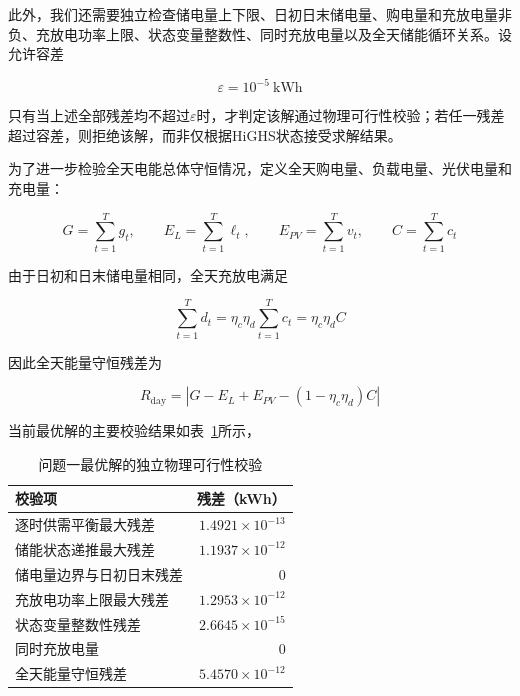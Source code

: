 \documentclass[UTF8]{ctexart}
\begin{document}
    此外，我们还需要独立检查储电量上下限、日初日末储电量、购电量和充放电量非负、充放电功率上限、状态变量整数性、同时充放电量以及全天储能循环关系。设允许容差
    
    \begin{equation}
        \varepsilon=10^{-5}\ \mathrm{kWh}
    \end{equation}
    
    只有当上述全部残差均不超过$\varepsilon$时，才判定该解通过物理可行性校验；若任一残差超过容差，则拒绝该解，而非仅根据HiGHS状态接受求解结果。\par
    
    为了进一步检验全天电能总体守恒情况，定义全天购电量、负载电量、光伏电量和充电量：
    
    \begin{equation}
        G=\sum_{t=1}^{T}g_t,\qquad
        E_L=\sum_{t=1}^{T}\ell_t,\qquad
        E_{PV}=\sum_{t=1}^{T}v_t,\qquad
        C=\sum_{t=1}^{T}c_t
    \end{equation}
    
    由于日初和日末储电量相同，全天充放电满足
    
    \begin{equation}
        \sum_{t=1}^{T}d_t
        =\eta_c\eta_d\sum_{t=1}^{T}c_t
        =\eta_c\eta_dC
    \end{equation}
    
    因此全天能量守恒残差为
    
    \begin{equation}
        R_{\mathrm{day}}
        =
        \left|
        G-E_L+E_{PV}
        -(1-\eta_c\eta_d)C
        \right|
    \end{equation}
    
    当前最优解的主要校验结果如表~\ref{tab:q1_validation}所示，
    
    \begin{table}[htbp]
        \centering
        \caption{问题一最优解的独立物理可行性校验}
        \label{tab:q1_validation}
        \begin{tabular}{lr}
            \toprule
            校验项 & 残差（kWh）\\
            \midrule
            逐时供需平衡最大残差 & $1.4921\times10^{-13}$\\
            储能状态递推最大残差 & $1.1937\times10^{-12}$\\
            储电量边界与日初日末残差 & 0\\
            充放电功率上限最大残差 & $1.2953\times10^{-12}$\\
            状态变量整数性残差 & $2.6645\times10^{-15}$\\
            同时充放电量 & 0\\
            全天能量守恒残差 & $5.4570\times10^{-12}$\\
            \bottomrule
        \end{tabular}
    \end{table}
    
\end{document}

